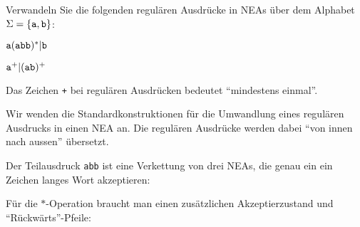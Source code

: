 Verwandeln Sie die folgenden regulären Ausdrücke in NEAs über
dem Alphabet $\Sigma =\{{\tt a},{\tt b}\}$:
\begin{teilaufgaben}
\item ${\tt a}({\tt abb})^*| {\tt b}$
\item ${\tt a}^+|({\tt ab})^+$
\end{teilaufgaben}

\begin{hinweis}
Das Zeichen {\tt +} bei regulären Ausdrücken bedeutet
``mindestens einmal''.
\end{hinweis}


\begin{loesung}
Wir wenden die Standardkonstruktionen für die Umwandlung eines regulären
Ausdrucks in einen NEA an. Die regulären Ausdrücke werden dabei
``von innen nach aussen'' übersetzt.
\def\zustand#1{
	\draw #1 circle[radius=0.2];
}
\def\akzeptierzustand#1{
	\zustand{#1}
	\draw #1 circle[radius=0.15];
}
\def\pfeil#1#2#3{
	\draw[->,shorten >= 0.2cm,shorten <= 0.2cm] #1 -- #2;
	\node at ($0.5*#1+0.5*#2$) [above] {#3};
}
\begin{teilaufgaben}
\item
\def\l{1.3}
\def\punkte{
	\coordinate (q0) at (0,0);
	\coordinate (q1) at (\l,0);
	\coordinate (q2) at ({2*\l},0);
	\coordinate (q3) at ({3*\l},0);
	\coordinate (q4) at ({4*\l},0);
	\coordinate (q5) at ({5*\l},0);
	\coordinate (qa) at ({-\l},0);
	\coordinate (qb) at ({-2*\l},0);
	\coordinate (qc) at ({-3*\l},0);
	\coordinate (z0) at ({-4*\l},-\l);
	\coordinate (z1) at ({-3*\l},{-2*\l});
	\coordinate (z2) at ({-2*\l},{-2*\l});
}
Der Teilausdruck {\tt abb} ist eine Verkettung von drei NEAs, die
genau ein ein Zeichen langes Wort akzeptieren:
\begin{center}
\end{center}
Für die $*$-Operation braucht man einen zusätzlichen Akzeptierzustand und
``Rückwärts''-Pfeile:
\begin{center}
\begin{tikzpicture}[>=latex,thick]

\end{tikzpicture}
\end{center}
\end{teilaufgaben}
\end{loesung}
